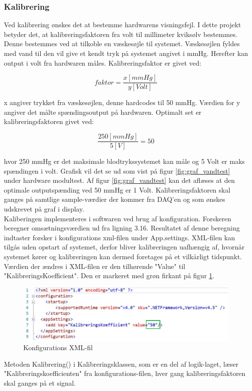 \subsubsection{Kalibrering}
Ved kalibrering ønskes det at bestemme hardwarens visningsfejl. I dette projekt betyder det, at kalibreringsfaktoren fra volt til millimeter kviksølv bestemmes. Denne bestemmes ved at tilkoble en væskesøjle til systemet. Væskesøjlen fyldes med vand til den vil give et kendt tryk på systemet angivet i mmHg. Herefter kan output i volt fra hardwaren måles. Kalibreringsfaktor er givet ved:
\begin{ceqn}
\begin{equation}
faktor=\dfrac{x [mmHg]}{y [Volt]}
\end{equation}
\end{ceqn}
x angiver trykket fra væskesøjlen, denne hardcodes til 50 mmHg. Værdien for y angiver det målte spændingsoutput på hardwaren. Optimalt set er kalibreringsfaktoren givet ved:
\begin{ceqn}
\begin{equation}
\dfrac{250 [mmHg]}{5 [V]}=50
\end{equation}
\end{ceqn}
hvor 250 mmHg er det maksimale blodtrykssystemet kan måle og 5 Volt er maks spændingen i volt. Grafisk vil det se ud som vist på figur \ref{fig:graf_vandtest} under hardware modultest. Af figur \ref{fig:graf_vandtest} kan det aflæses at den optimale outputspænding ved 50 mmHg er 1 Volt. Kalibreringsfaktoren skal ganges på samtlige sample-værdier der kommer fra DAQ’en og som ønskes udskrevet på graf i display.\\ 
Kaliberingen implementeres i softwaren ved brug af konfiguration. Forskeren beregner omsætningsværdien ud fra ligning 3.16. Resultatet af denne beregning indtaster forsker i konfigurations xml-filen under App.settings. XML-filen kan tilgås uden opstart af systemet, derfor bliver kalibreringen uafhængig af, hvornår systemet kører og kalibreringen kan dermed foretages på et vilkårligt tidspunkt. Værdien der ændres i XML-filen er den tilhørende "Value" til "KalibreringsKoefficient". Den er markeret med grøn firkant på figur \ref{fig:XML-fil}.
\begin{figure}[H]
	\centering
	\includegraphics[width=1.0\textwidth]{Figurer/XMLConfig}
	\caption{Konfigurations XML-fil}
	\label{fig:XML-fil}
\end{figure}
Metoden Kalibrering() i Kalibreringsklassen, som er en del af logik-laget, læser "Kalibreringskoefficienten" fra konfigurations-filen, hver gang kalibreringsfaktoren skal ganges på et signal. 

